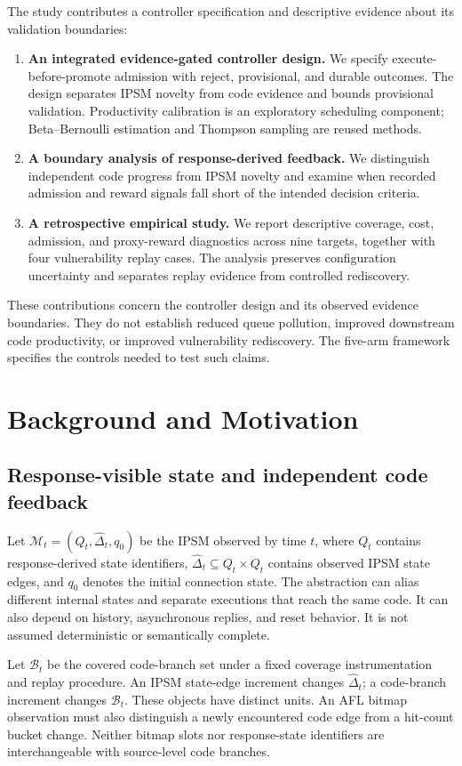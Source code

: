 \documentclass[final,5p,times,number]{elsarticle}
\begin{document}
The study contributes a controller specification and descriptive evidence about its validation boundaries:
\begin{enumerate}
\item \textbf{An integrated evidence-gated controller design.} We specify execute-before-promote admission with reject, provisional, and durable outcomes. The design separates IPSM novelty from code evidence and bounds provisional validation. Productivity calibration is an exploratory scheduling component; Beta--Bernoulli estimation and Thompson sampling are reused methods.
\item \textbf{A boundary analysis of response-derived feedback.} We distinguish independent code progress from IPSM novelty and examine when recorded admission and reward signals fall short of the intended decision criteria.
\item \textbf{A retrospective empirical study.} We report descriptive coverage, cost, admission, and proxy-reward diagnostics across nine targets, together with four vulnerability replay cases. The analysis preserves configuration uncertainty and separates replay evidence from controlled rediscovery.
\end{enumerate}
These contributions concern the controller design and its observed evidence boundaries. They do not establish reduced queue pollution, improved downstream code productivity, or improved vulnerability rediscovery. The five-arm framework specifies the controls needed to test such claims.

\section{Background and Motivation}
\label{sec:motivation}
\subsection{Response-visible state and independent code feedback}
Let $\mathcal{M}_t=(Q_t,\widehat{\Delta}_t,q_0)$ be the IPSM observed by time $t$, where $Q_t$ contains response-derived state identifiers, $\widehat{\Delta}_t\subseteq Q_t\times Q_t$ contains observed IPSM state edges, and $q_0$ denotes the initial connection state. The abstraction can alias different internal states and separate executions that reach the same code. It can also depend on history, asynchronous replies, and reset behavior. It is not assumed deterministic or semantically complete.

Let $\mathcal{B}_t$ be the covered code-branch set under a fixed coverage instrumentation and replay procedure. An IPSM state-edge increment changes $\widehat{\Delta}_t$; a code-branch increment changes $\mathcal{B}_t$. These objects have distinct units. An AFL bitmap observation must also distinguish a newly encountered code edge from a hit-count bucket change. Neither bitmap slots nor response-state identifiers are interchangeable with source-level code branches.
\end{document}
